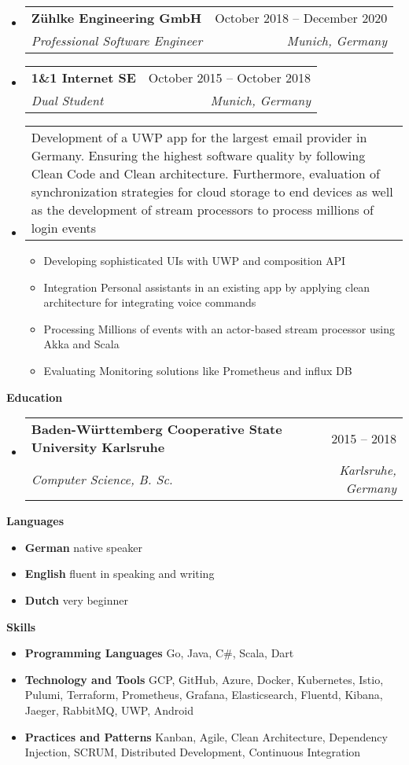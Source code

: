 \documentclass[letterpaper,12pt]{article}
\makeatletter
\renewcommand{\section}[2]{\vspace{5pt}
  \colorbox{teriary}{\color{white}\raggedbottom\normalsize\textbf{{#1}{\hspace{7pt}#2}}}
}
\newcommand{\resumeEntryStart}{\vspace{0.5\baselineskip}\begin{minipage}{\textwidth}\begin{itemize}[leftmargin=2.5mm]}
\newcommand{\resumeEntryEnd}{\end{itemize}\end{minipage}\vspace{1\baselineskip}}
\newcommand{\resumeItemListStart}{\begin{itemize}[leftmargin=4.5mm]}
\newcommand{\resumeItemListEnd}{\end{itemize}}
\newcommand{\resumeItem}[1]{
  \item\small{
    {#1 \vspace{-2pt}}
  }
}
\newcommand{\resumeEntryTSDL}[4]{
  \vspace{-1pt}\item[]
    \begin{tabularx}{0.97\textwidth}{X@{\hspace{60pt}}r}
      \textbf{\color{primary}#1} & {\color{accent}\small#2} \\
      \textit{\color{accent}\small#3} & \textit{\color{accent}\small#4} \\
    \end{tabularx}\vspace{-6pt}
}
\newcommand{\resumeEntryDesc}[1]{
  \vspace{-1pt}\item[] 
  \small{
    \begin{tabularx}{0.97\textwidth}{X}
      #1
    \end{tabularx}
  }
  \vspace{-6pt}
}
\newcommand{\resumeEntryS}[2]{
  \item[]\small{
    \textbf{\color{primary}#1 }{ #2 \vspace{-6pt}}
  }
}
\makeatother
\begin{document}
  \resumeEntryStart
    \resumeEntryTSDL
      {Zühlke Engineering GmbH}{October 2018 -- December 2020}
      {Professional Software Engineer}{Munich, Germany}
  \resumeEntryEnd

  \resumeEntryStart
    \resumeEntryTSDL
    {1\&1 Internet SE}{October 2015 -- October 2018}
    {Dual Student}{Munich, Germany}
    \resumeEntryDesc{Development of a UWP app for the largest email provider in Germany. Ensuring the highest software quality by following Clean Code and Clean architecture. Furthermore, evaluation of synchronization strategies for cloud storage to end devices as well as the development of stream processors to process millions of login events}
    \resumeItemListStart
      \resumeItem {Developing sophisticated UIs with UWP and composition API}
      \resumeItem {Integration Personal assistants in an existing app by applying clean architecture for integrating voice commands}
      \resumeItem {Processing Millions of events with an actor-based stream processor using Akka and Scala}
      \resumeItem {Evaluating Monitoring solutions like Prometheus and influx DB}
    \resumeItemListEnd
  \resumeEntryEnd

\section{\faGraduationCap}{Education}

\resumeEntryStart
  \resumeEntryTSDL
    {Baden-Württemberg Cooperative State University Karlsruhe}{2015 -- 2018}
    {Computer Science, B. Sc.}{Karlsruhe, Germany}
\resumeEntryEnd

\section{\faCommentDots}{Languages}

\resumeEntryStart
  \resumeEntryS{German} {native speaker}
  \resumeEntryS{English} {fluent in speaking and writing}
  \resumeEntryS{Dutch} {very beginner}
\resumeEntryEnd


\section{}{Skills}

\resumeEntryStart
  \resumeEntryS{Programming Languages} {Go, Java, C\#, Scala, Dart}
  \resumeEntryS{Technology and Tools} {GCP, GitHub, Azure, Docker, Kubernetes, Istio, Pulumi, Terraform, Prometheus, Grafana, Elasticsearch, Fluentd, Kibana, Jaeger, RabbitMQ, UWP, Android}
  \resumeEntryS{Practices and Patterns} {Kanban, Agile, Clean Architecture, Dependency Injection, SCRUM, Distributed Development, Continuous Integration}
\resumeEntryEnd
\end{document}
